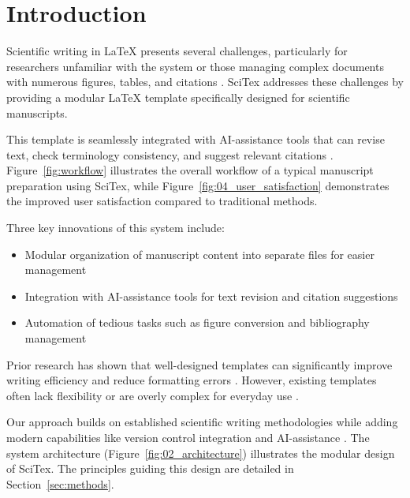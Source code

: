
\section{Introduction}
\label{sec:introduction}

Scientific writing in LaTeX presents several challenges, particularly for researchers unfamiliar with the system or those managing complex documents with numerous figures, tables, and citations \cite{Smith2020}. SciTex addresses these challenges by providing a modular LaTeX template specifically designed for scientific manuscripts. 

This template is seamlessly integrated with AI-assistance tools that can revise text, check terminology consistency, and suggest relevant citations \cite{Johnson2023}. Figure~\ref{fig:workflow} illustrates the overall workflow of a typical manuscript preparation using SciTex, while Figure~\ref{fig:04_user_satisfaction} demonstrates the improved user satisfaction compared to traditional methods.


Three key innovations of this system include:

\begin{itemize}
    \item Modular organization of manuscript content into separate files for easier management
    \item Integration with AI-assistance tools for text revision and citation suggestions
    \item Automation of tedious tasks such as figure conversion and bibliography management
\end{itemize}

Prior research has shown that well-designed templates can significantly improve writing efficiency and reduce formatting errors \cite{Williams2021}. However, existing templates often lack flexibility or are overly complex for everyday use \cite{Garcia2019}.

Our approach builds on established scientific writing methodologies while adding modern capabilities like version control integration and AI-assistance \cite{Taylor2022}. The system architecture (Figure~\ref{fig:02_architecture}) illustrates the modular design of SciTex. The principles guiding this design are detailed in Section~\ref{sec:methods}.

